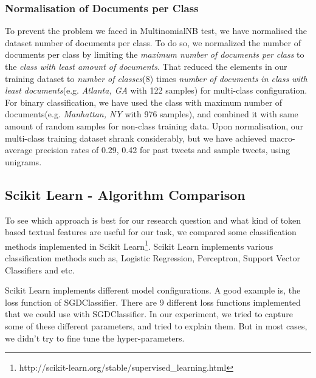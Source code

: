 \documentclass[twoside,11pt]{article}
\begin{document}
\subsubsection{Normalisation of Documents per Class}
To prevent the problem we faced in MultinomialNB test, we have normalised the dataset number of documents per class. To do so, we normalized the number of documents per class by limiting the \textit{maximum number of documents per class} to the \textit{class with least amount of documents}. That reduced the elements in our training dataset to \textit{number of classes}(8) times \textit{number of documents in class with least documents}(e.g. \textit{Atlanta, GA} with 122 samples)  for multi-class configuration. For binary classification, we have used the class with maximum number of documents(e.g. \textit{Manhattan, NY} with 976 samples), and combined it with same amount of random samples for non-class training data. Upon normalisation, our multi-class training dataset shrank considerably, but we have achieved macro-average precision rates of 0.29, 0.42 for past tweets and sample tweets, using unigrams.

\subsection{Scikit Learn - Algorithm Comparison}
To see which approach is best for our research question and what kind of token based textual features are useful for our task, we compared some classification methods implemented in Scikit Learn\footnote{http://scikit-learn.org/stable/supervised\_learning.html}. Scikit Learn implements various classification methods such as, Logistic Regression, Perceptron, Support Vector Classifiers and etc. 

Scikit Learn implements different model configurations. A good example is, the loss function of SGDClassifier. There are 9 different loss functions implemented that we could use with SGDClassifier. In our experiment, we tried to capture some of these different parameters, and tried to explain them. But in most cases, we didn't try to fine tune the hyper-parameters.
\end{document}
